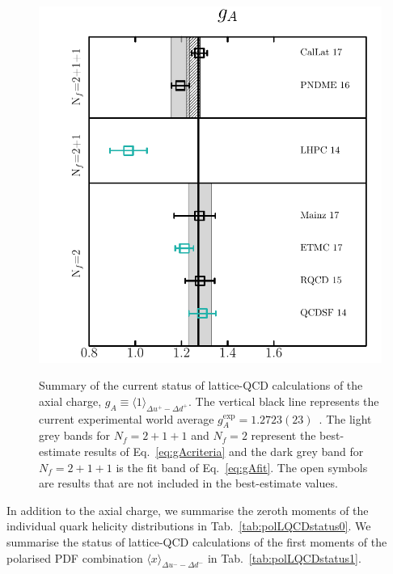 {%
\begin{figure}[t]
\centering
\includegraphics[scale=0.7]{plots/ga_summary.pdf}\\
\caption{\small Summary of the current status of lattice-QCD calculations of 
the axial charge, $g_A\equiv \langle 1\rangle_{\Delta u^+-\Delta d^+}$.
%
The vertical black line represents the current experimental world average 
$g_A^{\mathrm{exp}} = 1.2723(23)$~\cite{Olive:2016xmw}. 
%
The light grey bands for $N_f = 2+1+1$ and $N_f=2$ represent the best-estimate 
results of Eq.~\eqref{eq:gAcriteria} and the dark grey band for
$N_f = 2+1+1$ is the fit band of Eq.~\eqref{eq:gAfit}. 
%
The open symbols are results that are not included in the best-estimate values.
}    
\label{fig:gaLQCDstatus}
\end{figure}

In addition to the axial charge, we summarise the zeroth moments of the 
individual quark helicity distributions in Tab.~\ref{tab:polLQCDstatus0}. 
%
We summarise the status of lattice-QCD calculations of the
first moments of the polarised PDF combination 
$\langle x \rangle_{\Delta u^- - \Delta d^-}$ in Tab.~\ref{tab:polLQCDstatus1}. 

}
